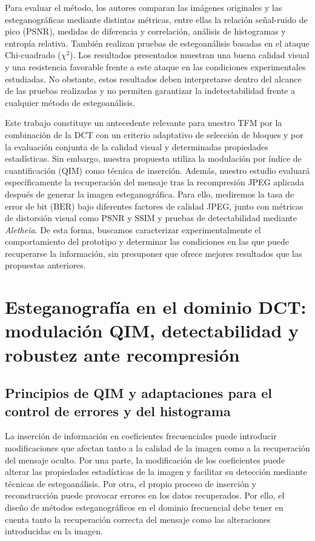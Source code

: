 \documentclass[IB]{TFUOC}%
\begin{document}
Para evaluar el método, los autores comparan las imágenes originales y las esteganográficas mediante distintas métricas, entre ellas la relación señal-ruido de pico ($\mathrm{PSNR}$), medidas de diferencia y correlación, análisis de histogramas y entropía relativa. También realizan pruebas de estegoanálisis basadas en el ataque Chi-cuadrado ($\chi^2$). Los resultados presentados muestran una buena calidad visual y una resistencia favorable frente a este ataque en las condiciones experimentales estudiadas. No obstante, estos resultados deben interpretarse dentro del alcance de las pruebas realizadas y no permiten garantizar la indetectabilidad frente a cualquier método de estegoanálisis.

Este trabajo constituye un antecedente relevante para nuestro TFM por la combinación de la DCT con un criterio adaptativo de selección de bloques y por la evaluación conjunta de la calidad visual y determinadas propiedades estadísticas. Sin embargo, nuestra propuesta utiliza la modulación por índice de cuantificación ($\mathrm{QIM}$) como técnica de inserción. Además, nuestro estudio evaluará específicamente la recuperación del mensaje tras la recompresión JPEG aplicada después de generar la imagen esteganográfica. Para ello, mediremos la tasa de error de bit ($\mathrm{BER}$) bajo diferentes factores de calidad JPEG, junto con métricas de distorsión visual como $\mathrm{PSNR}$ y $\mathrm{SSIM}$ y pruebas de detectabilidad mediante \textit{Aletheia}. De esta forma, buscamos caracterizar experimentalmente el comportamiento del prototipo y determinar las condiciones en las que puede recuperarse la información, sin presuponer que ofrece mejores resultados que las propuestas anteriores.


\section{Esteganografía en el dominio DCT: modulación QIM, detectabilidad y robustez ante recompresión}

\subsection{Principios de QIM y adaptaciones para el control de errores y del histograma}
La inserción de información en coeficientes frecuenciales puede introducir modificaciones que afectan tanto a la calidad de la imagen como a la recuperación del mensaje oculto. Por una parte, la modificación de los coeficientes puede alterar las propiedades estadísticas de la imagen y facilitar su detección mediante técnicas de estegoanálisis. Por otra, el propio proceso de inserción y reconstrucción puede provocar errores en los datos recuperados. Por ello, el diseño de métodos esteganográficos en el dominio frecuencial debe tener en cuenta tanto la recuperación correcta del mensaje como las alteraciones introducidas en la imagen.
\end{document}

